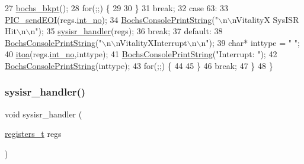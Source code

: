 \begin{DoxyCode}
27             \hyperlink{a00113_a3f7e7be8f62f43b2b62df54cac1590be_a3f7e7be8f62f43b2b62df54cac1590be}{bochs\_bkpt}();
28             \textcolor{keywordflow}{for}(;;) \{
29 
30             \}
31             \textcolor{keywordflow}{break};
32         \textcolor{keywordflow}{case} 63:
33             \hyperlink{a00029_a1119739f7932598c83c3f8ce42a649de_a1119739f7932598c83c3f8ce42a649de}{PIC\_sendEOI}(regs.\hyperlink{a00171_af311750a9b18afb3b1ed2d144fbe1cb0_af311750a9b18afb3b1ed2d144fbe1cb0}{int\_no});
34             \hyperlink{a00050_a19e1f554d03c977f8b947f21489daa41_a19e1f554d03c977f8b947f21489daa41}{BochsConsolePrintString}(\textcolor{stringliteral}{"\(\backslash\)n\(\backslash\)nVitalityX SysISR Hit\(\backslash\)n\(\backslash\)n"});
35             \hyperlink{a00080_abd1fa375737cd5ecd84c082738e3b195_abd1fa375737cd5ecd84c082738e3b195}{sysisr\_handler}(regs);
36             \textcolor{keywordflow}{break};
37         \textcolor{keywordflow}{default}:
38             \hyperlink{a00050_a19e1f554d03c977f8b947f21489daa41_a19e1f554d03c977f8b947f21489daa41}{BochsConsolePrintString}(\textcolor{stringliteral}{"\(\backslash\)n\(\backslash\)nVitalityXInterrupt\(\backslash\)n\(\backslash\)n"});
39             \textcolor{keywordtype}{char}* inttype = \textcolor{stringliteral}{"  "};
40             \hyperlink{a00092_af749add1ff19b6ff96a62f35ebb49b7e_af749add1ff19b6ff96a62f35ebb49b7e}{itoa}(regs.\hyperlink{a00171_af311750a9b18afb3b1ed2d144fbe1cb0_af311750a9b18afb3b1ed2d144fbe1cb0}{int\_no},inttype);
41             \hyperlink{a00050_a19e1f554d03c977f8b947f21489daa41_a19e1f554d03c977f8b947f21489daa41}{BochsConsolePrintString}(\textcolor{stringliteral}{"Interrupt: "});
42             \hyperlink{a00050_a19e1f554d03c977f8b947f21489daa41_a19e1f554d03c977f8b947f21489daa41}{BochsConsolePrintString}(inttype);
43             \textcolor{keywordflow}{for}(;;) \{
44 
45             \}
46             \textcolor{keywordflow}{break};
47     \}
48 \}
\end{DoxyCode}
\mbox{\label{a00080_abd1fa375737cd5ecd84c082738e3b195_abd1fa375737cd5ecd84c082738e3b195}} 
\subsubsection{\texorpdfstring{sysisr\+\_\+handler()}{sysisr\_handler()}}
{\footnotesize\ttfamily void sysisr\+\_\+handler (\begin{DoxyParamCaption}\item[{\hyperlink{a00083_adf58dbaf6139b4957c348711f2026957_adf58dbaf6139b4957c348711f2026957}{registers\+\_\+t}}]{regs }\end{DoxyParamCaption})}



